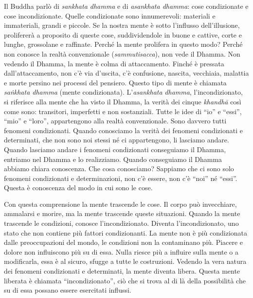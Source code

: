 Il Buddha parlò di \emph{sankhata dhamma} e di \emph{asankhata dhamma}:
cose condizionate e cose incondizionate. Quelle condizionate sono
innumerevoli: materiali e immateriali, grandi e piccole. Se la nostra
mente è sotto l'influsso dell'illusione, prolifererà a proposito di
queste cose, suddividendole in buone e cattive, corte e lunghe,
grossolane e raffinate. Perché la mente prolifera in questo modo? Perché
non conosce la realtà convenzionale (\emph{sammutisacca}), non vede il
Dhamma. Non vedendo il Dhamma, la mente è colma di attaccamento. Finché
è pressata dall'attaccamento, non c'è via d'uscita, c'è confusione,
nascita, vecchiaia, malattia e morte persino nei processi del pensiero.
Questo tipo di mente è chiamata \emph{saṅkhata dhamma} (mente
condizionata). L'\emph{asankhata} \emph{dhamma}, l'incondizionato, si
riferisce alla mente che ha visto il Dhamma, la verità dei cinque
\emph{khandhā} così come sono: transitori, imperfetti e non sostanziali.
Tutte le idee di ``io'' e ``essi'', ``mio'' e ``loro'', appartengono
alla realtà convenzionale. Sono davvero tutti fenomeni condizionati.
Quando conosciamo la verità dei fenomeni condizionati e determinati, che
non sono noi stessi né ci appartengono, li lasciamo andare. Quando
lasciamo andare i fenomeni condizionati conseguiamo il Dhamma, entriamo
nel Dhamma e lo realizziamo. Quando conseguiamo il Dhamma abbiamo chiara
conoscenza. Che cosa conosciamo? Sappiamo che ci sono solo fenomeni
condizionati e determinazioni, non c'è essere, non c'è ``noi'' né
``essi''. Questa è conoscenza del modo in cui sono le cose.

Con questa comprensione la mente trascende le cose. Il corpo può
invecchiare, ammalarsi e morire, ma la mente trascende queste
situazioni. Quando la mente trascende le condizioni, conosce
l'incondizionato. Diventa l'incondizionato, uno stato che non contiene
più fattori condizionanti. La mente non è più condizionata dalle
preoccupazioni del mondo, le condizioni non la contaminano più. Piacere
e dolore non influiscono più su di essa. Nulla riesce più a influire
sulla mente o a modificarla, essa è al sicuro, sfugge a tutte le
costruzioni. Vedendo la vera natura dei fenomeni condizionati e
determinati, la mente diventa libera. Questa mente liberata è chiamata
``incondizionato'', ciò che si trova al di là della possibilità che su
di essa possano essere esercitati influssi.

